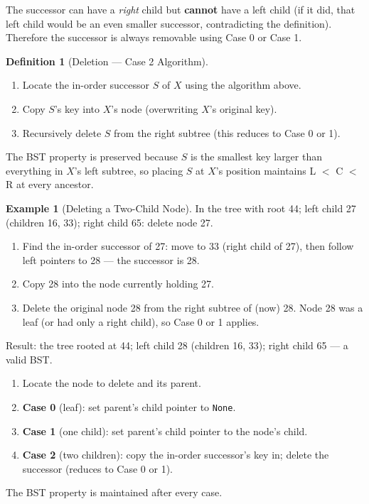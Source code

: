 \documentclass[11pt, a4paper, notitlepage]{report}
\theoremstyle{definition}
\newtheorem{definition}[theorem]{Definition}
\theoremstyle{remark}
\theoremstyle{definition}
\newtheorem{example}[theorem]{Example}
\begin{document}
The successor can have a \emph{right} child but \textbf{cannot} have a left child (if it did,
that left child would be an even smaller successor, contradicting the definition).  Therefore
the successor is always removable using Case 0 or Case 1.

\begin{definition}[Deletion --- Case 2 Algorithm]
\label{def:delete-case2}
\begin{enumerate}
  \item Locate the in-order successor $S$ of $X$ using the algorithm above.
  \item Copy $S$'s key into $X$'s node (overwriting $X$'s original key).
  \item Recursively delete $S$ from the right subtree (this reduces to Case 0 or 1).
\end{enumerate}
The BST property is preserved because $S$ is the smallest key larger than everything in
$X$'s left subtree, so placing $S$ at $X$'s position maintains L $<$ C $<$ R at every
ancestor.
\end{definition}

\begin{example}[Deleting a Two-Child Node]
\label{ex:delete-two-children}
In the tree with root 44; left child 27 (children 16, 33); right child 65: delete node 27.
\begin{enumerate}
  \item Find the in-order successor of 27: move to 33 (right child of 27), then follow
        left pointers to 28 --- the successor is 28.
  \item Copy 28 into the node currently holding 27.
  \item Delete the original node 28 from the right subtree of (now) 28.  Node 28 was a
        leaf (or had only a right child), so Case 0 or 1 applies.
\end{enumerate}
Result: the tree rooted at 44; left child 28 (children 16, 33); right child 65 --- a valid BST.
\end{example}

\begin{keyresult}[title={Key Result: Full Deletion Algorithm}]
\begin{enumerate}
  \item Locate the node to delete and its parent.
  \item \textbf{Case 0} (leaf): set parent's child pointer to \texttt{None}.
  \item \textbf{Case 1} (one child): set parent's child pointer to the node's child.
  \item \textbf{Case 2} (two children): copy the in-order successor's key in; delete the
        successor (reduces to Case 0 or 1).
\end{enumerate}
The BST property is maintained after every case.
\end{keyresult}
\end{document}
